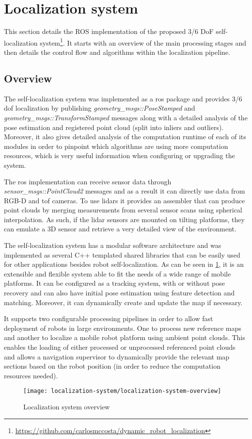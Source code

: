 \section{Localization system}

This section details the ROS implementation of the proposed 3/6 DoF self-localization system\footnote{\url{https://github.com/carlosmccosta/dynamic_robot_localization}}. It starts with an overview of the main processing stages and then details the control flow and algorithms within the localization pipeline.

\subsection{Overview}

The self-localization system was implemented as a \gls{ros} package and provides 3/6 \gls{dof} localization by publishing \emph{geometry\_msgs::PoseStamped} and \emph{geometry\_msgs::TransformStamped} messages along with a detailed analysis of the pose estimation and registered point cloud (split into inliers and outliers). Moreover, it also gives detailed analysis of the computation runtime of each of its modules in order to pinpoint which algorithms are using more computation resources, which is very useful information when configuring or upgrading the system.

The \gls{ros} implementation can receive sensor data through \emph{sensor\_msgs::PointCloud2} messages and as a result it can directly use data from RGB-D and \gls{tof} cameras. To use \glspl{lidar} it provides an assembler that can produce point clouds by merging measurements from several sensor scans using spherical interpolation. As such, if the \gls{lidar} sensors are mounted on tilting platforms, they can emulate a 3D sensor and retrieve a very detailed view of the environment.

The self-localization system has a modular software architecture and was implemented as several C++ templated shared libraries that can be easily used for other applications besides robot self-localization. As can be seen in \cref{fig:localization-system_localization-system-overview}, it is an extensible and flexible system able to fit the needs of a wide range of mobile platforms. It can be configured as a tracking system, with or without pose recovery and can also have initial pose estimation using feature detection and matching. Moreover, it can dynamically create and update the map if necessary.

It supports two configurable processing pipelines in order to allow fast deployment of robots in large environments. One to process new reference maps and another to localize a mobile robot platform using ambient point clouds. This enables the loading of either processed or unprocessed referenced point clouds and allows a navigation supervisor to dynamically provide the relevant map sections based on the robot position (in order to reduce the computation resources needed).

\begin{figure}[hb]
	\centering
	\texttt{[image: localization-system/localization-system-overview]}
	\caption{Localization system overview}
	\label{fig:localization-system_localization-system-overview}
\end{figure}
